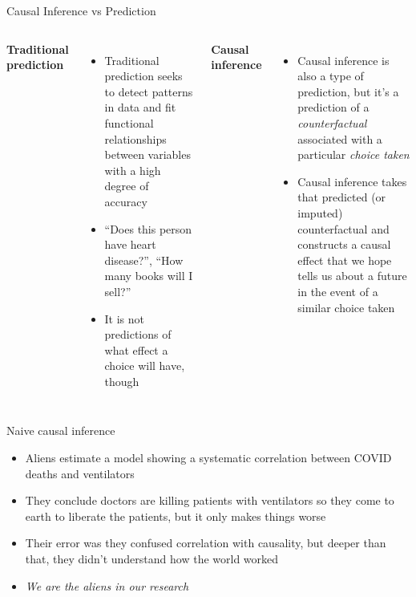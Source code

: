 \documentclass{beamer}
\begin{document}
\begin{frame}{Causal Inference vs Prediction}

  \begin{columns}
    \centering
    \textbf{Traditional prediction}
    \begin{itemize}
      \item Traditional prediction seeks to detect patterns in data and fit functional relationships between variables with a high degree of accuracy
      \item ``Does this person have heart disease?'', ``How many books will I sell?''
      \item It is not predictions of what effect a choice will have, though
    \end{itemize}
    \centering
    \textbf{Causal inference}
    \begin{itemize}
      \item Causal inference is also a type of prediction, but it's a prediction of a \emph{counterfactual} associated with a particular \emph{choice taken}
      \item Causal inference takes that predicted (or imputed) counterfactual and constructs a causal effect that we hope tells us about a future in the event of a similar choice taken
    \end{itemize}
  \end{columns}
\end{frame}



\begin{frame}{Naive causal inference}

  \begin{itemize}
    \item Aliens estimate a model showing a systematic correlation between COVID deaths and ventilators
    \item They conclude doctors are killing patients with ventilators so they come to earth to liberate the patients, but it only makes things worse
    \item Their error was they confused correlation with causality, but deeper than that, they didn't understand how the world worked
    \item \emph{We are the aliens in our research}
  \end{itemize}

\end{frame}
\end{document}
